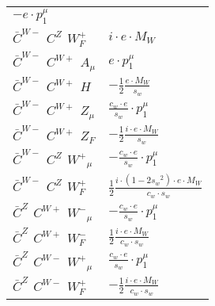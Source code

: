 \begin{center}
\begin{tabular}{|l|l|}
	$- e\cdot p_1^\mu $\\[2mm]
$\bar{C}^{W-}{}_{}$ \phantom{-} $C^{Z}{}_{}$ \phantom{-} $W^+_F{}_{}$ \phantom{-}  &
	$ i \cdot e \cdot M_W$\\[2mm]
$\bar{C}^{W-}{}_{}$ \phantom{-} $C^{W+}{}_{}$ \phantom{-} ${A}_{\mu }$ \phantom{-}  &
	$ e\cdot p_1^\mu $\\[2mm]
$\bar{C}^{W-}{}_{}$ \phantom{-} $C^{W+}{}_{}$ \phantom{-} ${H}_{}$ \phantom{-}  &
	$-\frac{1}{2}\frac{ e \cdot M_W}{ s_w}$\\[2mm]
$\bar{C}^{W-}{}_{}$ \phantom{-} $C^{W+}{}_{}$ \phantom{-} ${Z}_{\mu }$ \phantom{-}  &
	$\frac{ c_w \cdot e}{ s_w}\cdot p_1^\mu $\\[2mm]
$\bar{C}^{W-}{}_{}$ \phantom{-} $C^{W+}{}_{}$ \phantom{-} $Z_F{}_{}$ \phantom{-}  &
	$-\frac{1}{2}\frac{ i \cdot e \cdot M_W}{ s_w}$\\[2mm]
$\bar{C}^{W-}{}_{}$ \phantom{-} $C^{Z}{}_{}$ \phantom{-} $W^+{}_{\mu }$ \phantom{-}  &
	$-\frac{ c_w \cdot e}{ s_w}\cdot p_1^\mu $\\[2mm]
$\bar{C}^{W-}{}_{}$ \phantom{-} $C^{Z}{}_{}$ \phantom{-} $W^+_F{}_{}$ \phantom{-}  &
	$\frac{1}{2}\frac{ i \cdot (1-2 s_w {}^2) \cdot e \cdot M_W}{ c_w \cdot s_w}$\\[2mm]
$\bar{C}^{Z}{}_{}$ \phantom{-} $C^{W+}{}_{}$ \phantom{-} $W^-{}_{\mu }$ \phantom{-}  &
	$-\frac{ c_w \cdot e}{ s_w}\cdot p_1^\mu $\\[2mm]
$\bar{C}^{Z}{}_{}$ \phantom{-} $C^{W+}{}_{}$ \phantom{-} $W^-_F{}_{}$ \phantom{-}  &
	$\frac{1}{2}\frac{ i \cdot e \cdot M_W}{ c_w \cdot s_w}$\\[2mm]
$\bar{C}^{Z}{}_{}$ \phantom{-} $C^{W-}{}_{}$ \phantom{-} $W^+{}_{\mu }$ \phantom{-}  &
	$\frac{ c_w \cdot e}{ s_w}\cdot p_1^\mu $\\[2mm]
$\bar{C}^{Z}{}_{}$ \phantom{-} $C^{W-}{}_{}$ \phantom{-} $W^+_F{}_{}$ \phantom{-}  &
	$-\frac{1}{2}\frac{ i \cdot e \cdot M_W}{ c_w \cdot s_w}$\\ \hline
\end{tabular}


\end{center}
